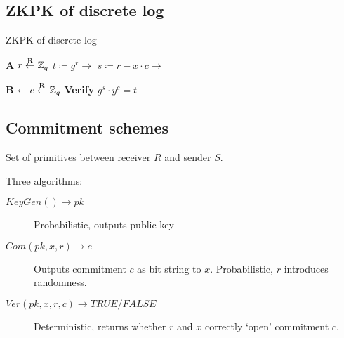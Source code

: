 \subsection{ZKPK of discrete log}

\begin{algorithm}
		\caption{ZKPK of discrete log}

		\begin{multicols}{2}
				\begin{algorithmic}[0]
						\State \textbf{A}
						\State $r \overset{\mathrm{R}}{\gets} \mathbb{Z}_q$
						\State $t \coloneqq g^r \rightarrow$
						\State
						\State $s \coloneqq r - x \cdot c \rightarrow$
				\end{algorithmic}

		\columnbreak

				\begin{algorithmic}[0]
						\State \textbf{B}
						\State
						\State
						\State $\leftarrow c \overset{\mathrm{R}}{\gets} \mathbb{Z}_q$
						\State \textbf{Verify} $g^s \cdot y^c = t$
				\end{algorithmic}
		\end{multicols}
\end{algorithm}

\subsection{Commitment schemes}

Set of primitives between receiver $R$ and sender $S$.

Three algorithms:
\begin{description}
		\item[$KeyGen() \rightarrow pk$] Probabilistic, outputs public key
		\item[$Com(pk, x, r) \rightarrow c$] Outputs commitment $c$ as bit
				string to $x$. Probabilistic, $r$ introduces randomness.
		\item[$Ver(pk, x, r, c) \rightarrow TRUE / FALSE$] Deterministic,
				returns whether $r$ and $x$ correctly `open' commitment $c$.
\end{description}

